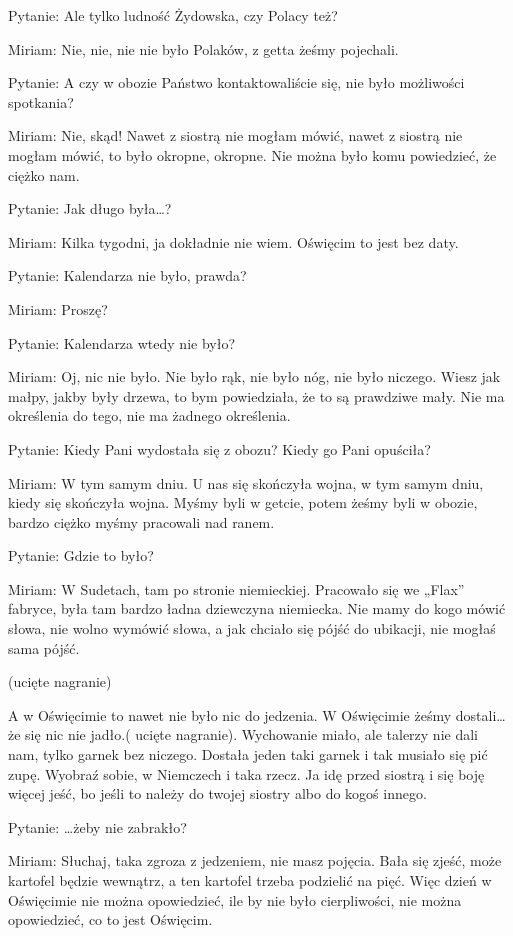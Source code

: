 Pytanie: Ale tylko ludność Żydowska, czy Polacy też? 

Miriam: Nie, nie, nie nie było Polaków, z getta żeśmy pojechali. 

Pytanie: A czy w obozie Państwo kontaktowaliście się, nie było możliwości spotkania? 

Miriam: Nie, skąd! Nawet z siostrą nie mogłam mówić, nawet z siostrą nie mogłam mówić, to było okropne, okropne. Nie można było komu powiedzieć, że ciężko nam. 

Pytanie: Jak długo była…?  

Miriam: Kilka tygodni, ja dokładnie nie wiem. Oświęcim to jest bez daty. 

Pytanie: Kalendarza nie było, prawda? 

Miriam: Proszę? 

Pytanie: Kalendarza wtedy nie było? 

Miriam: Oj, nic nie było. Nie było rąk, nie było nóg, nie było niczego. Wiesz jak małpy, jakby były drzewa, to bym powiedziała, że to są prawdziwe mały. Nie ma określenia do tego, nie ma żadnego określenia. 

 

Pytanie: Kiedy Pani wydostała się z obozu? Kiedy go Pani opuściła? 

Miriam: W tym samym dniu. U nas się skończyła wojna, w tym samym dniu, kiedy się skończyła wojna. Myśmy byli w getcie, potem żeśmy byli w obozie, bardzo ciężko myśmy pracowali nad ranem.  

Pytanie: Gdzie to było? 

Miriam: W Sudetach, tam po stronie niemieckiej. Pracowało się we „Flax” fabryce, była tam bardzo ładna dziewczyna niemiecka. Nie mamy do kogo mówić słowa, nie wolno wymówić słowa, a jak chciało się pójść do ubikacji, nie mogłaś sama pójść.   

(ucięte nagranie) 

A w Oświęcimie to nawet nie było nic do jedzenia. W Oświęcimie żeśmy dostali… że się nic nie jadło.( ucięte nagranie). Wychowanie miało, ale talerzy nie dali nam, tylko garnek bez niczego. Dostała jeden taki garnek i tak musiało się pić zupę. Wyobraź sobie, w Niemczech i taka rzecz. Ja idę przed siostrą i się boję więcej jeść, bo jeśli to należy do twojej siostry albo do kogoś innego.  

 

Pytanie: …żeby nie zabrakło? 

Miriam: Słuchaj, taka zgroza z jedzeniem, nie masz pojęcia. Bała się zjeść, może kartofel będzie wewnątrz, a ten kartofel trzeba podzielić na pięć. Więc dzień w Oświęcimie nie można opowiedzieć, ile by nie było cierpliwości, nie można opowiedzieć, co to jest Oświęcim. 

